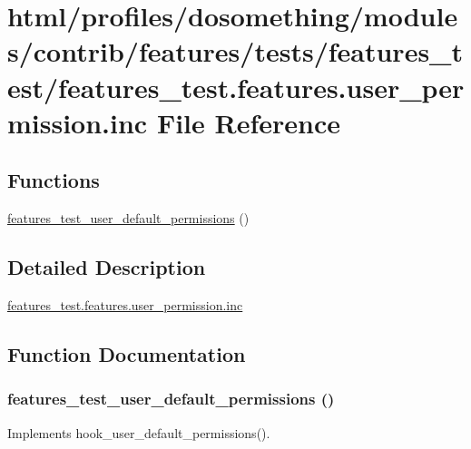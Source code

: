 \hypertarget{features__test_8features_8user__permission_8inc}{
\section{html/profiles/dosomething/modules/contrib/features/tests/features\_\-test/features\_\-test.features.user\_\-permission.inc File Reference}
\label{features__test_8features_8user__permission_8inc}
}
\subsection*{Functions}
\begin{DoxyCompactItemize}
\item 
\hyperlink{features__test_8features_8user__permission_8inc_ac98006b7d4fcd4ccb1be13a88c90b1b8}{features\_\-test\_\-user\_\-default\_\-permissions} ()
\end{DoxyCompactItemize}


\subsection{Detailed Description}
\hyperlink{features__test_8features_8user__permission_8inc}{features\_\-test.features.user\_\-permission.inc} 

\subsection{Function Documentation}
\hypertarget{features__test_8features_8user__permission_8inc_ac98006b7d4fcd4ccb1be13a88c90b1b8}{
\subsubsection[{features\_\-test\_\-user\_\-default\_\-permissions}]{\setlength{\rightskip}{0pt plus 5cm}features\_\-test\_\-user\_\-default\_\-permissions ()}}
\label{features__test_8features_8user__permission_8inc_ac98006b7d4fcd4ccb1be13a88c90b1b8}
Implements hook\_\-user\_\-default\_\-permissions(). 